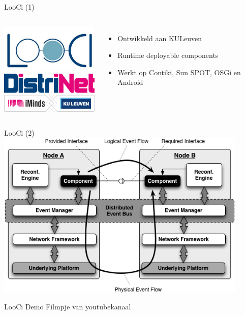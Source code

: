 \documentclass[presentation, bigger]{beamer}
\begin{document}
\begin{frame}[label=sec-2-3]{LooCi (1)}
  \begin{columns}[t]
    \centering
    \includegraphics[width=5cm,keepaspectration=true]{looci/looci.png}\\
    \includegraphics[width=5cm,keepaspectration=true]{looci/distrinet.png}
    \centering
    \begin{itemize}
    \item Ontwikkeld aan KULeuven
    \item Runtime deployable components
    \item Werkt op Contiki, Sun SPOT, OSGi en Android
    \end{itemize}
  \end{columns}
\end{frame}

\begin{frame}[label=sec-2-4]{LooCi (2)}
  \centering
  \includegraphics[width=0.9\textwidth,keepaspectration=true]{looci/LooCIExecEnvironment.png}
\end{frame}

\begin{frame}[label=sec-2-5]{LooCi Demo}
  Filmpje van youtubekanaal
\end{frame}
\end{document}
